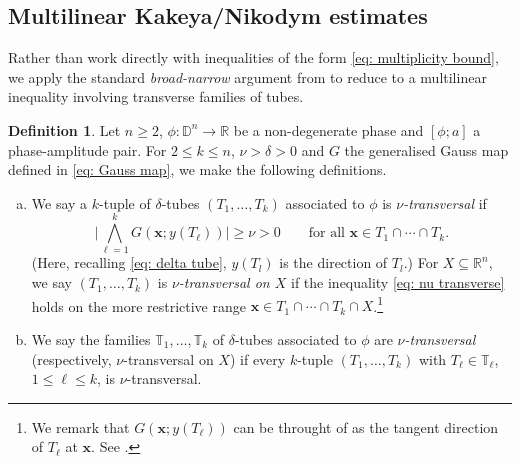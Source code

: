 \documentclass[reqno]{amsart}
\numberwithin{equation}{section}
\newcommand{\D}{\mathbb{D}}
\newcommand{\R}{\mathbb{R}}
\newcommand{\T}{\mathbb{T}}
\newcommand{\bx}{\mathbf{x}}
\theoremstyle{plain}
\theoremstyle{definition}
\newtheorem{definition}[theorem]{Definition}
\begin{document}



\subsection{Multilinear Kakeya/Nikodym estimates} Rather than work directly with inequalities of the form \eqref{eq: multiplicity bound}, we apply the standard \textit{broad-narrow} argument from \cite{BG2011} to reduce to a multilinear inequality involving transverse families of tubes. 


\begin{definition} Let $n \geq 2$, $\phi \colon \D^n \to \R$ be a non-degenerate phase and $[\phi;a]$ a phase-amplitude pair. For $2 \leq k \leq n$, $\nu > \delta > 0$ and $G$ the generalised Gauss map defined in \eqref{eq: Gauss map}, we make the following definitions.
\begin{enumerate}[a)]
    \item We say a $k$-tuple of $\delta$-tubes $(T_1, \dots, T_k)$ associated to $\phi$ is \textit{$\nu$-transversal} if 
\begin{equation}\label{eq: nu transverse}
    \big| \bigwedge_{\ell = 1}^k G(\bx; y(T_{\ell})) \big| \geq \nu > 0 \qquad \textrm{for all $\bx \in T_1 \cap \cdots \cap T_k$.}
\end{equation}
(Here, recalling \eqref{eq: delta tube}, $y(T_l)$ is the direction of $T_l$.)
 For $X \subseteq \R^n$, we say $(T_1, \dots, T_k)$ is \textit{$\nu$-transversal on $X$} if the inequality \eqref{eq: nu transverse} holds on the more restrictive range $\bx \in T_1 \cap \cdots \cap T_k \cap X$.\footnote{We remark that $G(\bx;y(T_{\ell}))$ can be throught of as the tangent direction of $T_{\ell}$ at $\bx$. See \cite[Lemma 5.2]{GHI2019}.}
\item We say the families $\T_1,\dots, \T_k$ of $\delta$-tubes associated to $\phi$ are \textit{$\nu$-transversal} (respectively, $\nu$-transversal on $X$)  if every $k$-tuple $(T_1, \dots, T_k)$ with $T_{\ell} \in \T_{\ell}$, $1 \leq \ell \leq k$, is $\nu$-transversal. 
\end{enumerate}
\end{definition}
\end{document}

